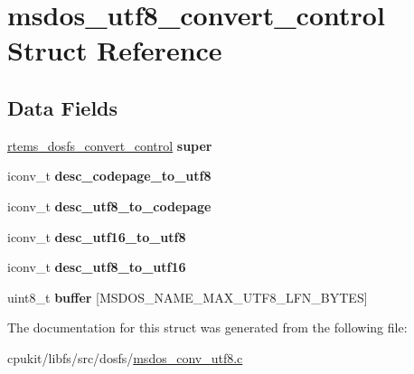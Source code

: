 \hypertarget{structmsdos__utf8__convert__control}{}\section{msdos\+\_\+utf8\+\_\+convert\+\_\+control Struct Reference}
\label{structmsdos__utf8__convert__control}
\subsection*{Data Fields}
\begin{DoxyCompactItemize}
\item 
\mbox{\label{structmsdos__utf8__convert__control_ae81f5341d697ea2c2741b32be51f6869}} 
\mbox{\hyperlink{structrtems__dosfs__convert__control}{rtems\+\_\+dosfs\+\_\+convert\+\_\+control}} {\bfseries super}
\item 
\mbox{\label{structmsdos__utf8__convert__control_ac10237190a69421c90ace4019c6992c4}} 
iconv\+\_\+t {\bfseries desc\+\_\+codepage\+\_\+to\+\_\+utf8}
\item 
\mbox{\label{structmsdos__utf8__convert__control_addce79e8efaaba74387830215b10d8ff}} 
iconv\+\_\+t {\bfseries desc\+\_\+utf8\+\_\+to\+\_\+codepage}
\item 
\mbox{\label{structmsdos__utf8__convert__control_ae550b5c0ac042d6b210a472dd58e1451}} 
iconv\+\_\+t {\bfseries desc\+\_\+utf16\+\_\+to\+\_\+utf8}
\item 
\mbox{\label{structmsdos__utf8__convert__control_a38ce97a35e2ddc417223fb8f64ee78d1}} 
iconv\+\_\+t {\bfseries desc\+\_\+utf8\+\_\+to\+\_\+utf16}
\item 
\mbox{\label{structmsdos__utf8__convert__control_a9921c114fb33d808d73728c9237e2e20}} 
uint8\+\_\+t {\bfseries buffer} \mbox{[}M\+S\+D\+O\+S\+\_\+\+N\+A\+M\+E\+\_\+\+M\+A\+X\+\_\+\+U\+T\+F8\+\_\+\+L\+F\+N\+\_\+\+B\+Y\+T\+ES\mbox{]}
\end{DoxyCompactItemize}


The documentation for this struct was generated from the following file\+:\begin{DoxyCompactItemize}
\item 
cpukit/libfs/src/dosfs/\mbox{\hyperlink{msdos__conv__utf8_8c}{msdos\+\_\+conv\+\_\+utf8.\+c}}\end{DoxyCompactItemize}
